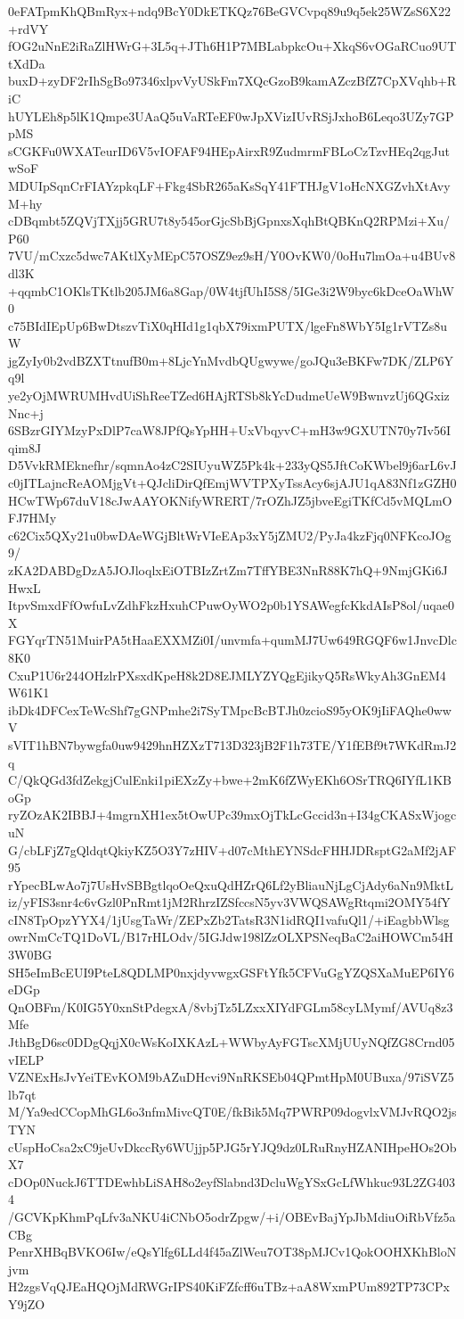 0eFATpmKhQBmRyx+ndq9BcY0DkETKQz76BeGVCvpq89u9q5ek25WZsS6X22+rdVY
fOG2uNnE2iRaZlHWrG+3L5q+JTh6H1P7MBLabpkcOu+XkqS6vOGaRCuo9UTtXdDa
buxD+zyDF2rIhSgBo97346xlpvVyUSkFm7XQcGzoB9kamAZczBfZ7CpXVqhb+RiC
hUYLEh8p5lK1Qmpe3UAaQ5uVaRTeEF0wJpXVizIUvRSjJxhoB6Leqo3UZy7GPpMS
sCGKFu0WXATeurID6V5vIOFAF94HEpAirxR9ZudmrmFBLoCzTzvHEq2qgJutwSoF
MDUIpSqnCrFIAYzpkqLF+Fkg4SbR265aKsSqY41FTHJgV1oHcNXGZvhXtAvyM+hy
cDBqmbt5ZQVjTXjj5GRU7t8y545orGjcSbBjGpnxsXqhBtQBKnQ2RPMzi+Xu/P60
7VU/mCxzc5dwc7AKtlXyMEpC57OSZ9ez9sH/Y0OvKW0/0oHu7lmOa+u4BUv8dl3K
+qqmbC1OKlsTKtlb205JM6a8Gap/0W4tjfUhI5S8/5IGe3i2W9byc6kDceOaWhW0
c75BIdIEpUp6BwDtszvTiX0qHId1g1qbX79ixmPUTX/lgeFn8WbY5Ig1rVTZs8uW
jgZyIy0b2vdBZXTtnufB0m+8LjcYnMvdbQUgwywe/goJQu3eBKFw7DK/ZLP6Yq9l
ye2yOjMWRUMHvdUiShReeTZed6HAjRTSb8kYcDudmeUeW9BwnvzUj6QGxizNnc+j
6SBzrGIYMzyPxDlP7caW8JPfQsYpHH+UxVbqyvC+mH3w9GXUTN70y7Iv56Iqim8J
D5VvkRMEknefhr/sqmnAo4zC2SIUyuWZ5Pk4k+233yQS5JftCoKWbel9j6arL6vJ
c0jITLajncReAOMjgVt+QJcliDirQfEmjWVTPXyTssAcy6sjAJU1qA83Nf1zGZH0
HCwTWp67duV18cJwAAYOKNifyWRERT/7rOZhJZ5jbveEgiTKfCd5vMQLmOFJ7HMy
c62Cix5QXy21u0bwDAeWGjBltWrVIeEAp3xY5jZMU2/PyJa4kzFjq0NFKcoJOg9/
zKA2DABDgDzA5JOJloqlxEiOTBIzZrtZm7TffYBE3NnR88K7hQ+9NmjGKi6JHwxL
ItpvSmxdFfOwfuLvZdhFkzHxuhCPuwOyWO2p0b1YSAWegfcKkdAIsP8ol/uqae0X
FGYqrTN51MuirPA5tHaaEXXMZi0I/unvmfa+qumMJ7Uw649RGQF6w1JnvcDlc8K0
CxuP1U6r244OHzlrPXsxdKpeH8k2D8EJMLYZYQgEjikyQ5RsWkyAh3GnEM4W61K1
ibDk4DFCexTeWcShf7gGNPmhe2i7SyTMpcBcBTJh0zcioS95yOK9jIiFAQhe0wwV
sVIT1hBN7bywgfa0uw9429hnHZXzT713D323jB2F1h73TE/Y1fEBf9t7WKdRmJ2q
C/QkQGd3fdZekgjCulEnki1piEXzZy+bwe+2mK6fZWyEKh6OSrTRQ6IYfL1KBoGp
ryZOzAK2IBBJ+4mgrnXH1ex5tOwUPc39mxOjTkLcGccid3n+I34gCKASxWjogcuN
G/cbLFjZ7gQldqtQkiyKZ5O3Y7zHIV+d07cMthEYNSdcFHHJDRsptG2aMf2jAF95
rYpecBLwAo7j7UsHvSBBgtlqoOeQxuQdHZrQ6Lf2yBliauNjLgCjAdy6aNn9MktL
iz/yFIS3snr4c6vGzl0PnRmt1jM2RhrzIZSfccsN5yv3VWQSAWgRtqmi2OMY54fY
cIN8TpOpzYYX4/1jUsgTaWr/ZEPxZb2TatsR3N1idRQI1vafuQl1/+iEagbbWlsg
owrNmCcTQ1DoVL/B17rHLOdv/5IGJdw198lZzOLXPSNeqBaC2aiHOWCm54H3W0BG
SH5eImBcEUI9PteL8QDLMP0nxjdyvwgxGSFtYfk5CFVuGgYZQSXaMuEP6IY6eDGp
QnOBFm/K0IG5Y0xnStPdegxA/8vbjTz5LZxxXIYdFGLm58cyLMymf/AVUq8z3Mfe
JthBgD6sc0DDgQqjX0cWsKoIXKAzL+WWbyAyFGTscXMjUUyNQfZG8Crnd05vIELP
VZNExHsJvYeiTEvKOM9bAZuDHcvi9NnRKSEb04QPmtHpM0UBuxa/97iSVZ5lb7qt
M/Ya9edCCopMhGL6o3nfmMivcQT0E/fkBik5Mq7PWRP09dogvlxVMJvRQO2jsTYN
cUspHoCsa2xC9jeUvDkccRy6WUjjp5PJG5rYJQ9dz0LRuRnyHZANIHpeHOs2ObX7
cDOp0NuckJ6TTDEwhbLiSAH8o2eyfSlabnd3DcluWgYSxGcLfWhkuc93L2ZG4034
/GCVKpKhmPqLfv3aNKU4iCNbO5odrZpgw/+i/OBEvBajYpJbMdiuOiRbVfz5aCBg
PenrXHBqBVKO6Iw/eQsYlfg6LLd4f45aZlWeu7OT38pMJCv1QokOOHXKhBloNjvm
H2zgsVqQJEaHQOjMdRWGrIPS40KiFZfcff6uTBz+aA8WxmPUm892TP73CPxY9jZO
